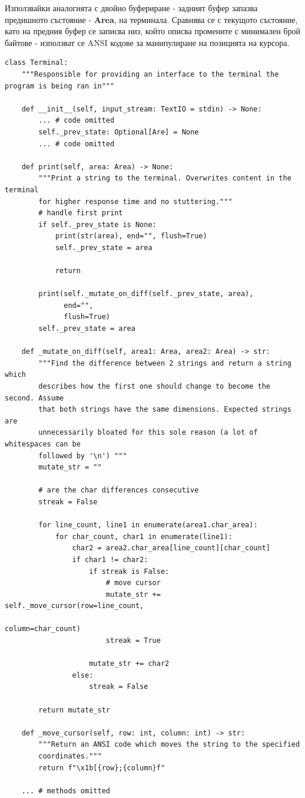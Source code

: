         Използвайки аналогията с двойно буфериране 
         - задният буфер запазва предишното 
        състояние - \textbf{Area}, на терминала. Сравнява се с текущото 
        състояние, като на предния буфер се записва низ, който описва промените
        с минимален брой байтове - използват се ANSI кодове за манипулиране на 
        позицията на курсора.

        \vspace{5mm}
        \begin{lstlisting}[style=py]
class Terminal:
    """Responsible for providing an interface to the terminal the program is being ran in"""

    def __init__(self, input_stream: TextIO = stdin) -> None:
        ... # code omitted
        self._prev_state: Optional[Are] = None
        ... # code omitted

    def print(self, area: Area) -> None:
        """Print a string to the terminal. Overwrites content in the terminal
        for higher response time and no stuttering."""
        # handle first print
        if self._prev_state is None:
            print(str(area), end="", flush=True)
            self._prev_state = area

            return

        print(self._mutate_on_diff(self._prev_state, area),
              end="",
              flush=True)
        self._prev_state = area

    def _mutate_on_diff(self, area1: Area, area2: Area) -> str:
        """Find the difference between 2 strings and return a string which
        describes how the first one should change to become the second. Assume
        that both strings have the same dimensions. Expected strings are
        unnecessarily bloated for this sole reason (a lot of whitespaces can be
        followed by '\n') """
        mutate_str = ""

        # are the char differences consecutive
        streak = False

        for line_count, line1 in enumerate(area1.char_area):
            for char_count, char1 in enumerate(line1):
                char2 = area2.char_area[line_count][char_count]
                if char1 != char2:
                    if streak is False:
                        # move cursor
                        mutate_str += self._move_cursor(row=line_count,
                                                        column=char_count)
                        streak = True

                    mutate_str += char2
                else:
                    streak = False

        return mutate_str

    def _move_cursor(self, row: int, column: int) -> str:
        """Return an ANSI code which moves the string to the specified
        coordinates."""
        return f"\x1b[{row};{column}f"

    ... # methods omitted
        \end{lstlisting}



